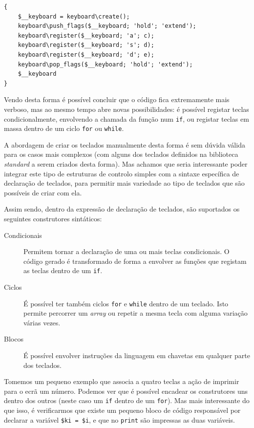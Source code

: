 \begin{lstlisting}[caption={Código gerado automaticamente para criação do teclado descrito no capitulo anterior}]
{
    $__keyboard = keyboard\create();
    keyboard\push_flags($__keyboard; 'hold'; 'extend');
    keyboard\register($__keyboard; 'a'; c);
    keyboard\register($__keyboard; 's'; d);
    keyboard\register($__keyboard; 'd'; e);
    keyboard\pop_flags($__keyboard; 'hold'; 'extend');
    $__keyboard
}
\end{lstlisting}

Vendo desta forma é possível concluir que o código fica extremamente mais verboso, mas ao mesmo tempo abre novas possibilidades: é possível registar teclas condicionalmente, envolvendo a chamada da função num \texttt{if}, ou registar teclas em massa dentro de um ciclo \texttt{for} ou \texttt{while}.

A abordagem de criar os teclados manualmente desta forma é sem dúvida válida para os casos mais complexos (com alguns dos teclados definidos na biblioteca \textit{standard} a serem criados desta forma). Mas achamos que seria interessante poder integrar este tipo de estruturas de controlo simples com a sintaxe específica de declaração de teclados, para permitir mais variedade ao tipo de teclados que são possíveis de criar com ela.

Assim sendo, dentro da expressão de declaração de teclados, são suportados os seguintes construtores sintáticos:
\begin{description}
 \item[Condicionais] Permitem tornar a declaração de uma ou mais teclas condicionais. O código gerado é transformado de forma a envolver as funções que registam as teclas dentro de um \texttt{if}.
 \item[Ciclos] É possível ter também ciclos \texttt{for} e \texttt{while} dentro de um teclado. Isto permite percorrer um \textit{array} ou repetir a mesma tecla com alguma variação várias vezes.
 \item[Blocos] É possível envolver instruções da linguagem em chavetas em qualquer parte dos teclados.
\end{description}

Tomemos um pequeno exemplo que associa a quatro teclas a ação de imprimir para o ecrã um número. Podemos ver que é possível encadear os construtores uns dentro dos outros (neste caso um \texttt{if} dentro de um \texttt{for}). Mas mais interessante do que isso, é verificarmos que existe um pequeno bloco de código responsável por declarar a variável \texttt{\$ki = \$i}, e que no \texttt{print} são impressas as duas variáveis.

